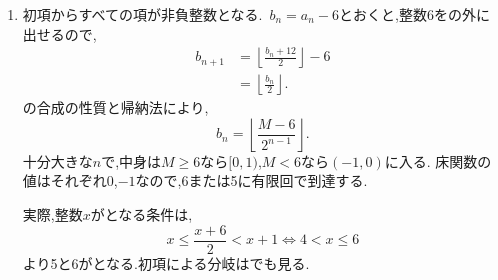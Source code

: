     \noindent {}\par\nobreak
    \begin{enumerate}[label=(\arabic*),parsep=3pt,beginpenalty=10000,format=\bookitemlink{example-gauss-role-6}{solution}{problem}]
      \item 初項からすべての項が非負整数となる.
            \,$b_n=a_n-6$とおくと,整数6をの外に出せるので,
            \begin{align*}
              b_{n+1}
                &=\left\lfloor\frac{b_n+12}{2}\right\rfloor-6\\
                &=\left\lfloor\frac{b_n}{2}\right\rfloor.
            \end{align*}
            の合成の性質と帰納法により,
            \[
              b_n=\left\lfloor\frac{M-6}{2^{n-1}}\right\rfloor.
            \]
            十分大きな$n$で,中身は$M\ge6$なら$[0,1)$,$M<6$なら$(-1,0)$に入る.
            床関数の値はそれぞれ0,$-1$なので,6または5に有限回で到達する.

            実際,整数$x$がとなる条件は,
            \[
              x\le\frac{x+6}{2}<x+1
              \iff 4<x\le6
            \]
            より5と6がとなる.初項による分岐はでも見る.
    \end{enumerate}
